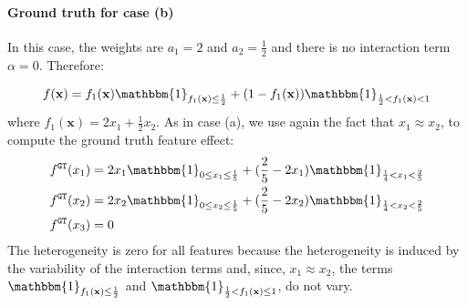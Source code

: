 \documentclass{article} %
\newcommand{\xb}{\mathbf{x}}
\begin{document}
\paragraph{Ground truth for case (b)}

In this case, the weights are $a_1 = 2$ and $a_2 = \frac{1}{2}$ and there is no interaction
term $\alpha=0$.
Therefore:

\begin{equation}
  \label{eq:case-b}
  f(\mathbf{x}) = f_1(\xb) \mathbbm{1}_{f_1(\xb) \leq \frac{1}{2}} + (1 - f_1(\xb)) \mathbbm{1}_{\frac{1}{2} < f_1(\xb) < 1}
\end{equation}
%
where $f_1(\xb) = 2 x_1 + \frac{1}{2} x_2$.
As in case (a), we use again the fact that $x_1 \approx x_2$,
to compute the ground truth feature effect:
%
\begin{align}
    \label{eq:case-b-app}
    f^{\mathtt{GT}}(x_1) &= 2 x_1 \mathbbm{1}_{0 \leq x_1 \leq \frac{1}{5}} + (\frac{2}{5} - 2 x_1) \mathbbm{1}_{\frac{1}{4} < x_1 < \frac{2}{5}} \\
    f^{\mathtt{GT}}(x_2) &= 2 x_2 \mathbbm{1}_{0 \leq x_2 \leq \frac{1}{5}} + (\frac{2}{5} - 2 x_2) \mathbbm{1}_{\frac{1}{4} < x_2 < \frac{2}{5}} \\
    f^{\mathtt{GT}}(x_3) &= 0
\end{align}
%
The heterogeneity is zero for all features because the heterogeneity is induced by the variability
of the interaction terms and, since, $x_1 \approx x_2$, the terms
$\mathbbm{1}_{f_1(\xb) \leq \frac{1}{2}}$ and $\mathbbm{1}_{\frac{1}{2} < f_1(\xb) \leq 1}$, do not vary.
%
\end{document}
